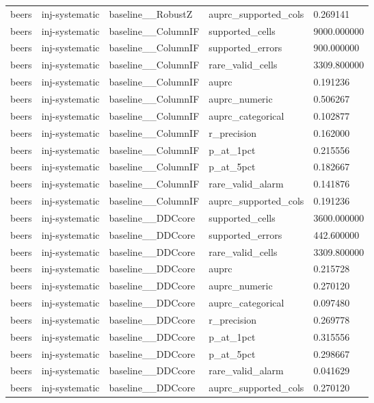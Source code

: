 \begin{tabular}{lllll}
beers & inj-systematic & baseline\_\_RobustZ & auprc\_supported\_cols & 0.269141 \\
beers & inj-systematic & baseline\_\_ColumnIF & supported\_cells & 9000.000000 \\
beers & inj-systematic & baseline\_\_ColumnIF & supported\_errors & 900.000000 \\
beers & inj-systematic & baseline\_\_ColumnIF & rare\_valid\_cells & 3309.800000 \\
beers & inj-systematic & baseline\_\_ColumnIF & auprc & 0.191236 \\
beers & inj-systematic & baseline\_\_ColumnIF & auprc\_numeric & 0.506267 \\
beers & inj-systematic & baseline\_\_ColumnIF & auprc\_categorical & 0.102877 \\
beers & inj-systematic & baseline\_\_ColumnIF & r\_precision & 0.162000 \\
beers & inj-systematic & baseline\_\_ColumnIF & p\_at\_1pct & 0.215556 \\
beers & inj-systematic & baseline\_\_ColumnIF & p\_at\_5pct & 0.182667 \\
beers & inj-systematic & baseline\_\_ColumnIF & rare\_valid\_alarm & 0.141876 \\
beers & inj-systematic & baseline\_\_ColumnIF & auprc\_supported\_cols & 0.191236 \\
beers & inj-systematic & baseline\_\_DDCcore & supported\_cells & 3600.000000 \\
beers & inj-systematic & baseline\_\_DDCcore & supported\_errors & 442.600000 \\
beers & inj-systematic & baseline\_\_DDCcore & rare\_valid\_cells & 3309.800000 \\
beers & inj-systematic & baseline\_\_DDCcore & auprc & 0.215728 \\
beers & inj-systematic & baseline\_\_DDCcore & auprc\_numeric & 0.270120 \\
beers & inj-systematic & baseline\_\_DDCcore & auprc\_categorical & 0.097480 \\
beers & inj-systematic & baseline\_\_DDCcore & r\_precision & 0.269778 \\
beers & inj-systematic & baseline\_\_DDCcore & p\_at\_1pct & 0.315556 \\
beers & inj-systematic & baseline\_\_DDCcore & p\_at\_5pct & 0.298667 \\
beers & inj-systematic & baseline\_\_DDCcore & rare\_valid\_alarm & 0.041629 \\
beers & inj-systematic & baseline\_\_DDCcore & auprc\_supported\_cols & 0.270120 \\

\end{tabular}
